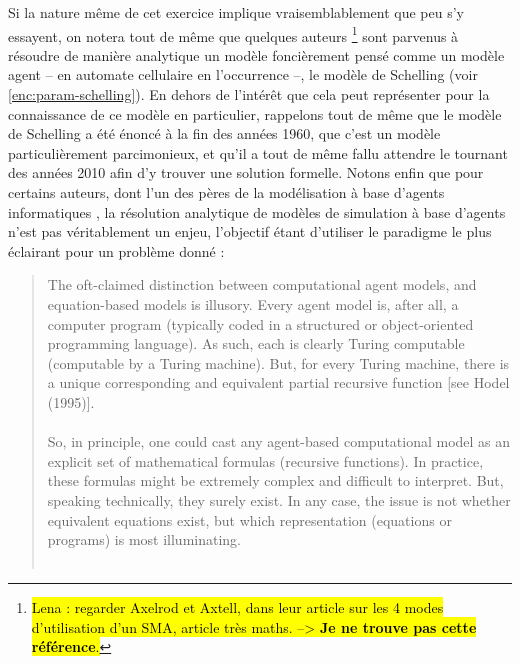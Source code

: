 Si la nature même de cet exercice implique vraisemblablement que peu s'y essayent, on notera tout de même que quelques auteurs \autocite{zhang_tipping_2011,grauwin_dynamic_2012}\footnote{
	\hl{Lena : regarder Axelrod et Axtell, dans leur article sur les 4 modes d'utilisation d'un SMA, article très maths. --> \textbf{Je ne trouve pas cette référence}.}
} sont parvenus à résoudre de manière analytique un modèle foncièrement pensé comme un modèle agent -- en automate cellulaire en l'occurrence --, le modèle de Schelling (voir \cref{enc:param-schelling}).
En dehors de l'intérêt que cela peut représenter pour la connaissance de ce modèle en particulier, rappelons tout de même que le modèle de Schelling a été énoncé à la fin des années 1960, que c'est un modèle particulièrement parcimonieux, et qu'il a tout de même fallu attendre le tournant des années 2010 afin d'y trouver une solution formelle.
Notons enfin que pour certains auteurs, dont l'un des pères de la modélisation à base d'agents informatiques \textcite{epstein2006remarks}, la résolution analytique de modèles de simulation à base d'agents n'est pas véritablement un enjeu, l'objectif étant d'utiliser le paradigme le plus \og éclairant\fg{} pour un problème donné :
\begin{quotation}
	\noindent \og
	The oft-claimed distinction between computational agent models, and equation-based models is illusory.
	Every agent model is, after all, a computer program (typically coded in a structured or object-oriented programming language).
	As such, each is clearly Turing computable (computable by a Turing machine).
	But, for every Turing machine, there is a unique corresponding and equivalent partial recursive function [see Hodel (1995)].\\
	\textelp{}\\
	So, in principle, one could cast any agent-based computational model as an explicit set of mathematical formulas (recursive functions).
	In practice, these formulas might be extremely complex and difficult to interpret.
	But, speaking technically, they surely exist.\textelp{}
	In any case, the issue is not whether equivalent equations exist, but which representation (equations or programs) is most illuminating.
	\fg{}\\
	\mbox{}~ \hfill \textcite[1590-1591]{epstein2006remarks}
\end{quotation}

